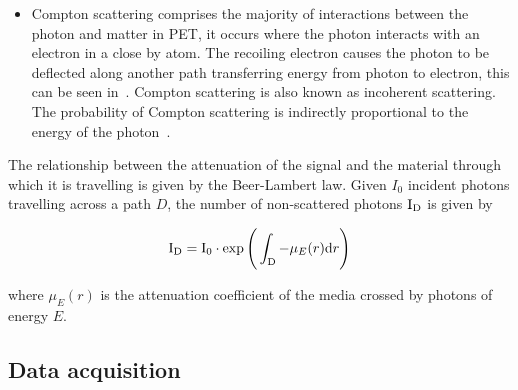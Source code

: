 \begin{itemize}
                    \item Compton scattering comprises the majority of interactions between the photon and matter in \gls{PET}, it occurs where the photon interacts with an electron in a close by atom. The recoiling electron causes the photon to be deflected along another path transferring energy from photon to electron, this can be seen in~. Compton scattering is also known as incoherent scattering. The probability of Compton scattering is indirectly proportional to the energy of the photon~\parencite{petspringer}.
                \end{itemize}
                
                The relationship between the attenuation of the signal and the material through which it is travelling is given by the Beer-Lambert law. Given $I_0$ incident photons travelling across a path $D$, the number of non-scattered photons $\mathrm{I}_{\mathrm{D}}$ is given by %
                 
                \begin{equation} \label{sec:eq:beer_lambert_law}
                    \rmI_{\rmD} = \rmI_{0} \cdot \exp\Bigg(\int_{\rmD} - \mu_E(r)\rmd r \Bigg) %
                \end{equation}

                \noindent where $\mu_E(r)$ is the attenuation coefficient of the media crossed by photons of energy $E$.
        
        \subsection{Data acquisition} \label{sec:data_acquisition}
            
